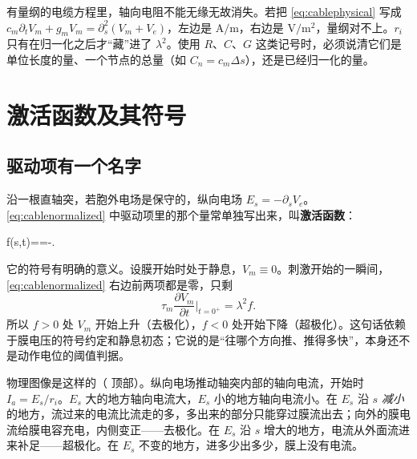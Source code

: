 \begin{pitfall}[“电缆方程就是 $c\,\partial_tV+gV=\partial_s^2V$，电阻可以省略”]
有量纲的电缆方程里，轴向电阻不能无缘无故消失。若把 \eqref{eq:cablephysical} 写成 $c_m\partial_tV_m+g_mV_m=\partial_s^2(V_m+V_e)$，左边是 $\mathrm{A/m}$，右边是 $\mathrm{V/m^2}$，量纲对不上。$r_i$ 只有在归一化之后才“藏”进了 $\lambda^2$。使用 $R$、$C$、$G$ 这类记号时，必须说清它们是单位长度的量、一个节点的总量（如 $C_n=c_m\Delta s$），还是已经归一化的量。
\end{pitfall}

\section{激活函数及其符号}\label{sec:neuro-activating}

\subsection{驱动项有一个名字}
沿一根直轴突，若胞外电场是保守的，纵向电场 $E_s=-\partial_sV_e$。\eqref{eq:cablenormalized} 中驱动项里的那个量常单独写出来，叫\textbf{激活函数}：
\begin{keyeq}
f(s,t)==-\qquad[\mathrm{V/m^2}].
\label{eq:activating}
\end{keyeq}
它的符号有明确的意义。设膜开始时处于静息，$V_m\equiv0$。刺激开始的一瞬间，\eqref{eq:cablenormalized} 右边前两项都是零，只剩
\begin{equation}
\tau_m\frac{\partial V_m}{\partial t}\Big|_{t=0^+}=\lambda^2f .
\end{equation}
所以 $f>0$ 处 $V_m$ 开始上升（去极化），$f<0$ 处开始下降（超极化）。这句话依赖于膜电压的符号约定和静息初态；它说的是“往哪个方向推、推得多快”，本身还不是动作电位的阈值判据。

物理图像是这样的（ 顶部）。纵向电场推动轴突内部的轴向电流，开始时 $I_a=E_s/r_i$。$E_s$ 大的地方轴向电流大，$E_s$ 小的地方轴向电流小。在 $E_s$ 沿 $s$ \emph{减小}的地方，流过来的电流比流走的多，多出来的部分只能穿过膜流出去；向外的膜电流给膜电容充电，内侧变正——去极化。在 $E_s$ 沿 $s$ 增大的地方，电流从外面流进来补足——超极化。在 $E_s$ 不变的地方，进多少出多少，膜上没有电流。


